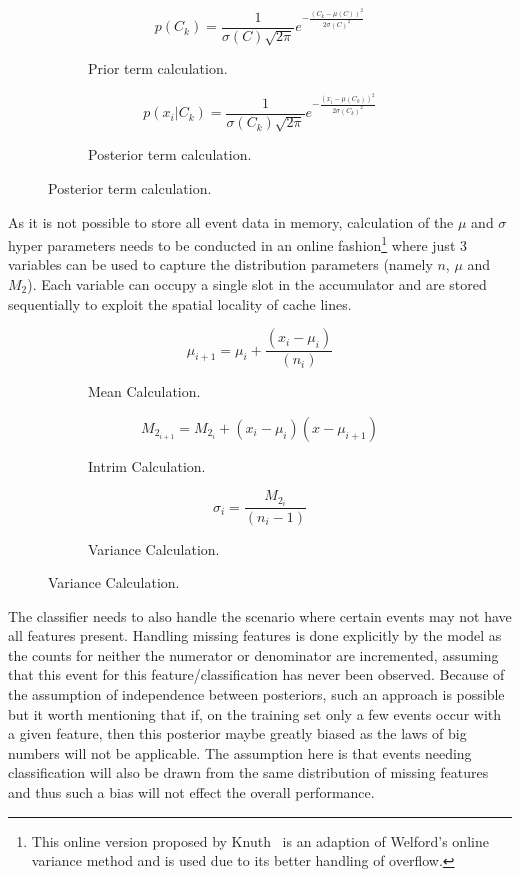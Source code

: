 \documentclass[a4paper,11pt]{scrreprt}
\begin{document}
\begin{figure}[h!]
\begin{subfigure}[t]{2.5 in}
\[p(C_k) = \frac{1}{\sigma(C)\sqrt{2\pi}}e^{-\frac{(C_k - \mu(C))^2}{2\sigma(C)^2}}\]
\caption{Prior term calculation.}
\end{subfigure}
\begin{subfigure}[t]{2.5 in}
\[p(x_i | C_k) = \frac{1}{\sigma(C_k)\sqrt{2\pi}}e^{-\frac{(x_i - \mu(C_k))^2}{2\sigma(C_k)^2}}\]
\caption{Posterior term calculation.}
\end{subfigure}
\end{figure}
As it is not possible to store all event data in memory, calculation of the \(\mu\) and \(\sigma\) hyper parameters needs to be conducted in an online fashion\footnote{This online version proposed by Knuth~\cite{knuth-aop} is an adaption of Welford's online variance method and is used due to its better handling of overflow.} where just 3 variables can be used to capture the distribution parameters (namely \(n\), \(\mu\) and \(M_2\)). Each variable can occupy a single slot in the accumulator and are stored sequentially to exploit the spatial locality of cache lines.

\captionsetup[subfigure]{labelfont=bf,textfont=normalfont,singlelinecheck=off,justification=centering,labelformat=simple, labelsep=colon}
\begin{figure}[h!]
\begin{subfigure}[t]{2.5 in}
\[\mu_{i+1} = \mu_i + \frac{(x_i - \mu_i)}{(n_i)}\]
\caption{Mean Calculation.}
\end{subfigure}
\begin{subfigure}[t]{2.5 in}
\[M_{2_{i+1}} = M_{2_i} + (x_i - \mu_i)(x - \mu_{i+1})\]
\caption{Intrim Calculation.}
\end{subfigure}
\begin{subfigure}[t]{2.5 in}
\[\sigma_i = \frac{M_{2_i}}{(n_i-1)}\]
\caption{Variance Calculation.}
\end{subfigure}
\end{figure}

The classifier needs to also handle the scenario where certain events may not have all features present. Handling missing features is done explicitly by the model as the counts for neither the numerator or denominator are incremented, assuming that this event for this feature/classification has never been observed. Because of the assumption of independence between posteriors, such an approach is possible but it worth mentioning that if, on the training set only a few events occur with a given feature, then this posterior maybe greatly biased as the laws of big numbers will not be applicable. The assumption here is that events needing classification will also be drawn from the same distribution of missing features and thus such a bias will not effect the overall performance.
\end{document}
